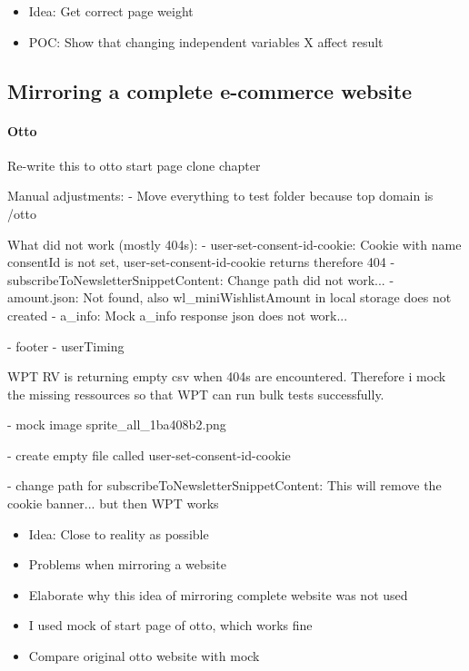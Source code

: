 \begin{itemize}
    \item Idea: Get correct page weight
    \item POC: Show that changing independent variables X affect result
\end{itemize}









\subsection{Mirroring a complete e-commerce website}

\paragraph{Otto}

Re-write this to otto start page clone chapter

Manual adjustments:
- Move everything to test folder because top domain is /otto

What did not work (mostly 404s):
- user-set-consent-id-cookie: Cookie with name consentId is not set, user-set-consent-id-cookie returns therefore 404
- subscribeToNewsletterSnippetContent: Change path did not work...
- amount.json: Not found, also wl\_miniWishlistAmount in local storage does not created
- a\_info: Mock a\_info response json does not work...

- footer
- userTiming


WPT RV is returning empty csv when 404s are encountered.
Therefore i mock the missing ressources so that WPT can run bulk tests successfully.

- mock image sprite\_all\_1ba408b2.png

- create empty file called user-set-consent-id-cookie

- change path for subscribeToNewsletterSnippetContent: This will remove the cookie banner... but then WPT works



\begin{itemize}
    \item Idea: Close to reality as possible
    \item Problems when mirroring a website
    \item Elaborate why this idea of mirroring complete website was not used
    \item I used mock of start page of otto, which works fine
    \item Compare original otto website with mock
\end{itemize}






